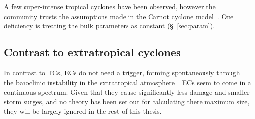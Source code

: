 A few super-intense tropical cyclones have been observed, however the community
 trusts the assumptions made in the
Carnot cyclone model~\cite{camargo2019tropical}.
One deficiency is treating the bulk parameters
as constant (§~\ref{sec:param}).

\subsection{Contrast to extratropical cyclones}
In contrast to TCs,  ECs do not need a trigger, forming
spontaneously through the baroclinic instability
in the extratropical atmosphere~\cite{lorenz1960energy}.
ECs seem to come in a continuous spectrum.
Given that they cause significantly less damage
and smaller storm surges, and no theory has been
 set out for calculating there maximum size,
they will be largely ignored in the rest of this thesis.

